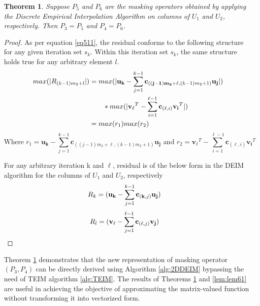 \documentclass{article}
\newtheorem{theorem}{Theorem}
\begin{document}
\begin{theorem}\label{lem63}
Suppose $P_5$ and $P_6$ are the masking operators obtained by applying the Discrete Empirical Interpolation Algorithm on columns of $U_1$ and $U_2$, respectively. Then $P_3=P_5$ and $P_4=P_6$.
\end{theorem}
\begin{proof}
    As per equation \eqref{eq511},  the residual conforms to the following structure for any given iteration set $s_k$. Within this iteration set $s_k$, the same structure holds true for any arbitrary element $l$.
\begin{equation*}
     \begin{split}
        max(\lvert R_{(k-1)m_2+l} \rvert)&=max(\lvert \bold{u_k}-\sum_{j=1}^{k-1}\bold{c}_{\bold{((j-1)m_2+\ell},(k-1)m_2+1)}\bold{u_j} \rvert)\\
        & \quad \quad *max(\lvert\bold{v_\ell}^T-\sum_{i=1}^{\ell-1}\bold{c}_{(\bold{\ell},i)}\bold{v_i}^T \rvert)\\
                            &= max(r_1)max(r_2)
     \end{split}
 \end{equation*}
\begin{equation*}
\text{Where } r_1 = \mathbf{u_k} - \sum_{j=1}^{k-1} \mathbf{c}_{\left( (j-1)m_2 + \ell , (k-1)m_2 + 1 \right)} \mathbf{u_j} 
\text{ and } r_2 = \mathbf{v_\ell}^T - \sum_{i=1}^{\ell-1} \mathbf{c}_{(\ell, i)} \mathbf{v_i}^T
\end{equation*}


For any arbitrary iteration k and $\ell$, residual is of the below form in the DEIM algorithm for the columns of $U_1$ and $U_2$, respectively 
  \begin{equation*}
     \begin{split}
         R_{k}&=(\bold{u_k}-\sum_{j=1}^{k-1}\bold{c}_{(\bold{k},j)}\bold{u_j})
     \end{split}
 \end{equation*}
 \begin{equation*}
     \begin{split}
         R_{l}&=(\bold{v_\ell}-\sum_{j=1}^{\ell-1}\bold{c}_{(\bold{\ell},j)}\bold{v_j})
     \end{split}
 \end{equation*}
\end{proof}
Theorem \ref{lem63} demonstrates that the new representation of masking operator $(P_3,P_4)$ can be directly derived using Algorithm \ref{alg:2DDEIM} bypassing the need of TEIM algorithm \ref{alg:TEIM}. The results of Theorems \ref{lem63} and \ref{lem:lem61} are useful in achieving the objective of approximating the matrix-valued function without transforming it into vectorized form.
\end{document}

